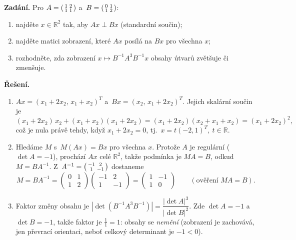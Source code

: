 \documentclass[11pt,a4paper]{article}
\begin{document}
\begin{priklad} \par
\textbf{Zadání.}
Pro $A=\begin{psmallmatrix}1&2\\1&1\end{psmallmatrix}$ a~$B=\begin{psmallmatrix}0&1\\1&2\end{psmallmatrix}$:
\begin{enumerate}[label=(\arabic*)]
  \item najděte $x\in\mathbb{R}^2$ tak, aby $Ax\perp Bx$ (standardní součin);
  \item najděte matici zobrazení, které $Ax$ posílá na $Bx$ pro všechna $x$;
  \item rozhodněte, zda zobrazení $x\mapsto B^{-1}A^3B^{-1}x$ obsahy útvarů zvětšuje či zmenšuje.
\end{enumerate}

\textbf{Řešení.}
\begin{enumerate}[label=(\arabic*)]
  \item $Ax=(x_1+2x_2,\,x_1+x_2)^T$ a~$Bx=(x_2,\,x_1+2x_2)^T$. Jejich skalární součin je
    \[ (x_1+2x_2)\,x_2+(x_1+x_2)(x_1+2x_2)=(x_1+2x_2)(x_2+x_1+x_2)=(x_1+2x_2)^2, \]
    což je nula právě tehdy, když $x_1+2x_2=0$, tj.\ $\boxed{x=t(-2,1)^T,\ t\in\mathbb{R}}$.
  \item Hledáme $M$ s~$M(Ax)=Bx$ pro všechna $x$. Protože $A$ je regulární ($\det A=-1$), prochází $Ax$ celé $\mathbb{R}^2$, takže podmínka je $MA=B$, odkud $M=BA^{-1}$. Z~$A^{-1}=\begin{psmallmatrix}-1&2\\1&-1\end{psmallmatrix}$ dostaneme
    \[ M=BA^{-1}=\begin{pmatrix}0&1\\1&2\end{pmatrix}\begin{pmatrix}-1&2\\1&-1\end{pmatrix}=\begin{pmatrix}1&-1\\1&0\end{pmatrix}\qquad(\text{ověření }MA=B). \]
  \item Faktor změny obsahu je $|\det(B^{-1}A^3B^{-1})|=\dfrac{|\det A|^3}{|\det B|^2}$. Zde $\det A=-1$ a~$\det B=-1$, takže faktor je $\boxed{\tfrac{1}{1}=1}$: obsahy se \emph{nemění} (zobrazení je zachovává, jen převrací orientaci, neboť celkový determinant je $-1<0$).
\end{enumerate}
\end{priklad}
\end{document}
